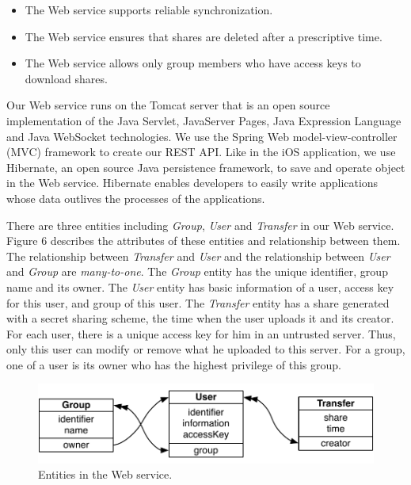 \documentclass[twocolumn,10pt]{article}
\begin{document}
\begin{itemize}
\setlength{\itemsep}{1pt}
\setlength{\parskip}{0pt}
\setlength{\parsep}{0pt}
	\item The Web service supports reliable synchronization.
    \item The Web service ensures that shares are deleted after a prescriptive time.
    \item The Web service allows only group members who have access keys to download shares.
\end{itemize}

Our Web service runs on the Tomcat server that is an open source implementation of the Java Servlet, JavaServer Pages, Java Expression Language and Java WebSocket technologies. We use the Spring Web model-view-controller (MVC) framework to create our REST API. Like in the iOS application, we use Hibernate, an open source Java persistence framework, to save and operate object in the Web service. Hibernate enables developers to easily write applications whose data outlives the processes of the applications.

There are three entities including \emph{Group}, \emph{User} and \emph{Transfer} in our Web service. Figure 6 describes the attributes of these entities and relationship between them. The relationship between \emph{Transfer} and \emph{User} and the relationship between \emph{User} and \emph{Group} are \emph{many-to-one}. The \emph{Group} entity has the unique identifier, group name and its owner. The \emph{User} entity has basic information of a user, access key for this user, and group of this user. The \emph{Transfer} entity has a share generated with a secret sharing scheme, the time when the user uploads it and its creator. For each user, there is a unique access key for him in an untrusted server. Thus, only this user can modify or remove what he uploaded to this server. For a group, one of a user is its owner who has the highest privilege of this group.

\begin{figure}[t]
	\centering
	\includegraphics[scale=0.5]{entites}
	\caption{Entities in the Web service.}
\end{figure}
\end{document}
